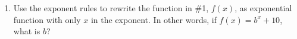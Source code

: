 \documentclass[12pt, oneside]{article}
\begin{document}
\begin{enumerate}
\item Use the exponent rules to rewrite the function in \#1, $f(x)$, as exponential function with only $x$ in the exponent. In other words, if $f(x)=b^x+10$, what is $b$? 


\end{enumerate}
\end{document}
